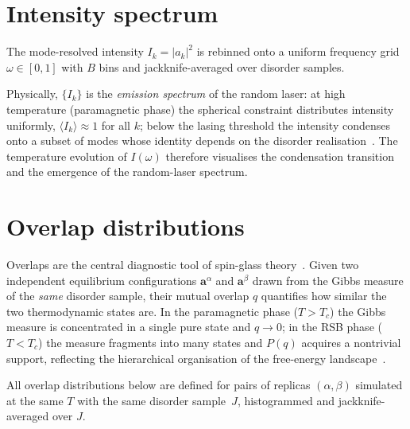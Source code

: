 \documentclass[11pt,a4paper]{article}
\newcommand{\avg}[1]{\langle #1 \rangle}
\begin{document}
\section{Intensity spectrum}

The mode-resolved intensity $I_k = |a_k|^2$ is rebinned onto a
uniform frequency grid $\omega \in [0,1]$ with $B$ bins and
jackknife-averaged over disorder samples.

Physically, $\{I_k\}$ is the \emph{emission spectrum} of the random
laser: at high temperature (paramagnetic phase) the spherical
constraint distributes intensity uniformly, $\avg{I_k} \approx 1$
for all $k$; below the lasing threshold the intensity condenses
onto a subset of modes whose identity depends on the disorder
realisation~\cite{Antenucci2015a,Ghofraniha2015}.  The
temperature evolution of $I(\omega)$ therefore visualises the
condensation transition and the emergence of the random-laser
spectrum.

\section{Overlap distributions}

Overlaps are the central diagnostic tool of spin-glass
theory~\cite{Parisi1979,Parisi1983,MPV1987}.  Given two
independent equilibrium configurations $\bm{a}^\alpha$ and
$\bm{a}^\beta$ drawn from the Gibbs measure of the \emph{same}
disorder sample, their mutual overlap $q$ quantifies how similar
the two thermodynamic states are.  In the paramagnetic phase
($T > T_c$) the Gibbs measure is concentrated in a single pure state
and $q \to 0$; in the RSB phase ($T < T_c$) the measure fragments
into many states and $P(q)$ acquires a nontrivial support,
reflecting the hierarchical organisation of the free-energy
landscape~\cite{MPV1987,Parisi1983}.

All overlap distributions below are defined for pairs of replicas
$(\alpha,\beta)$ simulated at the same $T$ with the same disorder
sample~$J$, histogrammed and jackknife-averaged over $J$.

\end{document}
